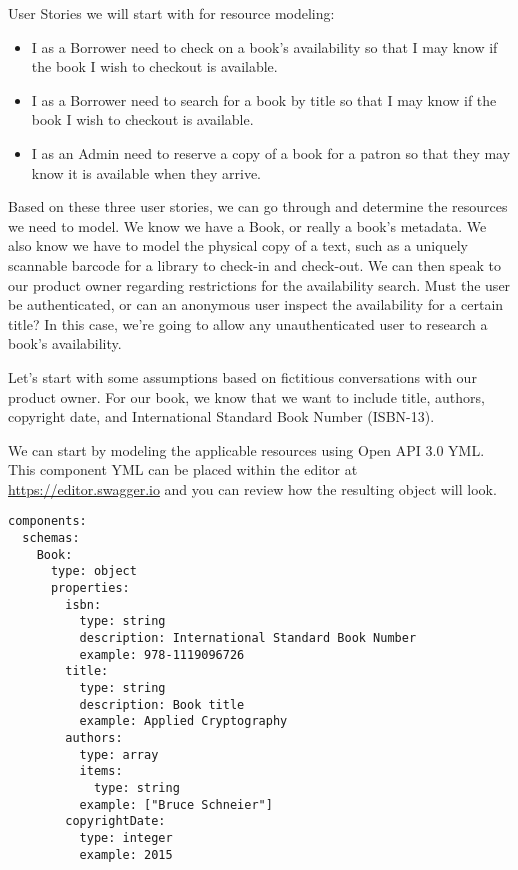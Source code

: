 User Stories we will start with for resource modeling:

\begin{itemize}
  \item I as a Borrower need to check on a book's availability so that I may know if the book I wish to checkout is available.
  \item I as a Borrower need to search for a book by title so that I may know if the book I wish to checkout is available.
  \item I as an Admin need to reserve a copy of a book for a patron so that they may know it is available when they arrive.
\end{itemize}

Based on these three user stories, we can go through and determine the resources we need to model.  We know we have a Book, or really a book's metadata.  We also know we have to model the physical copy of a text, such as a uniquely scannable barcode for a library to check-in and check-out.  We can then speak to our product owner regarding restrictions for the availability search.  Must the user be authenticated, or can an anonymous user inspect the availability for a certain title?  In this case, we're going to allow any unauthenticated user to research a book's availability.

Let's start with some assumptions based on fictitious conversations with our product owner.  For our book, we know that we want to include title, authors, copyright date, and International Standard Book Number (ISBN-13).

\begin{minipage}{\linewidth}
We can start by modeling the applicable resources using Open API 3.0 YML.  This component YML can be placed within the editor at \url{https://editor.swagger.io} and you can review how the resulting object will look.
\begin{code}
\begin{lstlisting}[belowskip=-\baselineskip]
components:
  schemas:
    Book:
      type: object
      properties:
        isbn:
          type: string
          description: International Standard Book Number
          example: 978-1119096726
        title:
          type: string
          description: Book title
          example: Applied Cryptography
        authors:
          type: array
          items:
            type: string
          example: ["Bruce Schneier"]
        copyrightDate:
          type: integer
          example: 2015
\end{lstlisting}
\end{code}
\end{minipage}

